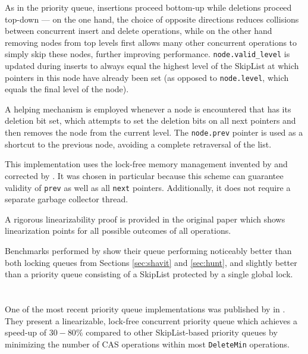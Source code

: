 As in the \citeauthor{shavit2000skiplist} priority queue, insertions proceed bottom-up while
deletions proceed top-down --- on the one hand, the choice of opposite directions reduces collisions
between concurrent insert and delete operations, while on the other hand removing nodes from top levels first
allows many other concurrent operations to simply skip these nodes, further improving performance.
\lstinline|node.valid_level| is updated during inserts to always equal the highest level of the SkipList
at which pointers in this node have already been set (as opposed to \lstinline|node.level|, which equals
the final level of the node).

A helping mechanism is employed whenever a node is encountered that has its deletion bit set, which attempts
to set the deletion bits on all next pointers and then removes the node from the current level. The
\lstinline|node.prev| pointer is used as a shortcut to the previous node, avoiding a complete retraversal
of the list.

This implementation uses the lock-free memory management invented by \citeauthor{valois1996lock}
\cite{valois1995lock,valois1996lock} and corrected by \citeauthor{michael1995correction}
\cite{michael1995correction}. It was chosen in particular because this scheme can guarantee validity
of \lstinline|prev| as well as all \lstinline|next| pointers. Additionally, it does not require a separate
garbage collector thread.

A rigorous linearizability proof is provided in the original paper \cite{sundell2003fast} which shows
linearization points for all possible outcomes of all operations.

Benchmarks performed by \citeauthor{sundell2003fast} show their queue performing noticeably better than both locking
queues from Sections \ref{sec:shavit} and \ref{sec:hunt}, and slightly better than a priority queue
consisting of a SkipList protected by a single global lock.

\section{\citeauthor{linden2013skiplist}} \label{sec:linden}

One of the most recent priority queue implementations was published by \citeauthor{linden2013skiplist}
in \citeyear{linden2013skiplist} \cite{linden2013skiplist}. They present a linearizable, lock-free concurrent priority
queue which achieves a speed-up of $30-80\%$ compared to other SkipList-based priority queues by
minimizing the number of \ac{CAS} operations within most \lstinline|DeleteMin| operations.

